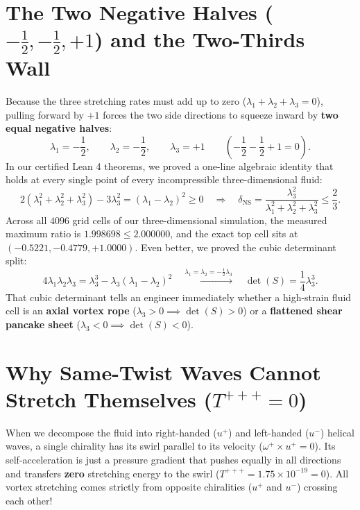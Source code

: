 \documentclass[11pt,a4paper]{article}
\theoremstyle{definition}
\begin{document}
\section{The Two Negative Halves ($-\frac{1}{2}, -\frac{1}{2}, +1$) and the Two-Thirds Wall}
Because the three stretching rates must add up to zero ($\lambda_1 + \lambda_2 + \lambda_3 = 0$), pulling forward by $+1$ forces the two side directions to squeeze inward by \textbf{two equal negative halves}:
\begin{equation}
\lambda_1 = -\frac{1}{2}, \qquad \lambda_2 = -\frac{1}{2}, \qquad \lambda_3 = +1 \qquad \left(-\frac{1}{2} - \frac{1}{2} + 1 = 0\right).
\end{equation}
In our certified Lean 4 theorems, we proved a one-line algebraic identity that holds at every single point of every incompressible three-dimensional fluid:
\begin{equation}
2(\lambda_1^2 + \lambda_2^2 + \lambda_3^2) - 3\lambda_3^2 = (\lambda_1 - \lambda_2)^2 \ge 0 \quad \Longrightarrow \quad \delta_{\mathrm{NS}} = \frac{\lambda_3^2}{\lambda_1^2 + \lambda_2^2 + \lambda_3^2} \le \frac{2}{3}.
\end{equation}
Across all $4096$ grid cells of our three-dimensional simulation, the measured maximum ratio is $1.998698 \le 2.000000$, and the exact top cell sits at $(-0.5221, -0.4779, +1.0000)$. Even better, we proved the cubic determinant split:
\begin{equation}
4\lambda_1\lambda_2\lambda_3 = \lambda_3^3 - \lambda_3(\lambda_1 - \lambda_2)^2 \quad \xrightarrow{\lambda_1 = \lambda_2 = -\frac{1}{2}\lambda_3} \quad \det(S) = \frac{1}{4}\lambda_3^3.
\end{equation}
That cubic determinant tells an engineer immediately whether a high-strain fluid cell is an \textbf{axial vortex rope} ($\lambda_3 > 0 \implies \det(S) > 0$) or a \textbf{flattened shear pancake sheet} ($\lambda_3 < 0 \implies \det(S) < 0$).

\section{Why Same-Twist Waves Cannot Stretch Themselves ($T^{+++} = 0$)}
When we decompose the fluid into right-handed ($u^+$) and left-handed ($u^-$) helical waves, a single chirality has its swirl parallel to its velocity ($\omega^+ \times u^+ = 0$). Its self-acceleration is just a pressure gradient that pushes equally in all directions and transfers \textbf{zero} stretching energy to the swirl ($T^{+++} = 1.75 \times 10^{-19} = 0$). All vortex stretching comes strictly from opposite chiralities ($u^+$ and $u^-$) crossing each other!
\end{document}
